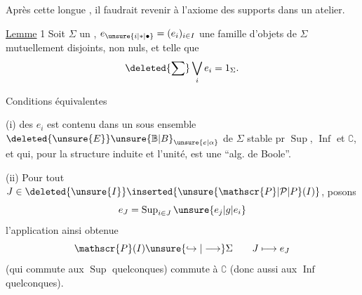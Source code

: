 
Après cette longue , il faudrait revenir à l'axiome des supports dans un atelier.

\uline{Lemme} 1 Soit $\Sigma$ un , $e_{\unsure{i|\ast|\bullet}}=(e_i)_{i\in I}$ une famille d'objets de $\Sigma$ mutuellement disjoints,  non nuls, et telle que
\[
\deleted{\sum}\bigvee_i e_i=1_{\Sigma}.
\]

Conditions équivalentes

(i)  des $e_i$ est contenu dans un sous ensemble $\deleted{\unsure{E}}\unsure{\mathbb{B}|B}_{\unsure{e|\alpha}}$ de $\Sigma$ stable pr  $\operatorname{Sup}$,  $\operatorname{Inf}$ et $\complement$, et qui, pour la structure induite et l'unité, est une ``alg. de Boole''.

(ii)  Pour tout $J\in\deleted{\unsure{I}}\inserted{\unsure{\mathscr{P}|\mathcal{P}|P}(I)}$, posons
\[
e_J=\operatorname{Sup}_{i\in J}\unsure{e_j|g|e_i}
\]
l'application ainsi obtenue
\[
\mathscr{P}(I)\unsure{\hookrightarrow|\longrightarrow}\Sigma\qquad J\longmapsto e_J
\]
(qui commute  aux $\operatorname{Sup}$ quelconques) commute à $\complement$ (donc aussi aux $\operatorname{Inf}$ quelconques).

